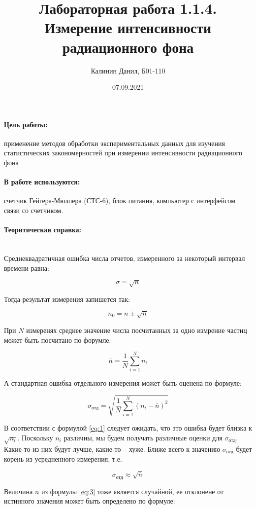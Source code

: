 \documentclass[a4paper, 12pt]{article}
\author{Калинин Данил, Б01-110}
\date{07.09.2021}
\title{Лабораторная работа 1.1.4.\\Измерение интенсивности радиационного фона}
\newcommand{\parag}[1]{\paragraph*{#1:}}
\begin{document}
\maketitle

\parag {Цель работы}
применение методов обработки экспериментальных данных для изучения статистических закономерностей при измерении интенсивности радиационного фона

\parag {В работе используются}
счетчик Гейгера-Мюллера (СТС-6), блок питания, компьютер с интерфейсом связи со счетчиком.

\parag {Теоритическая справка} ~\\
Среднеквадратичная ошибка числа отчетов, измеренного за некоторый интервал времени равна:

\begin{equation} \label{eq:1}
    \sigma = \sqrt{n}
\end{equation}

Тогда результат измерения запишется так:

\begin{equation} \label{eq:2}
    n_0 = n \pm \sqrt{n}
\end{equation}

При $N$ измеренях среднее значение числа посчитанных за одно измрение частиц может быть посчитано по форумле:

\begin{equation} \label{eq:3}
    \bar{n} = \frac{1}{N} \sum_{i=1}^N {n_i}
\end{equation}

А стандартная ошибка отдельного измерения может быть оценена по формуле:

\begin{equation} \label{eq:4}
    \sigma_{отд} = \sqrt {\frac{1}{N} \sum_{i=1}^N ({n_i - \bar{n}})^2}
\end{equation}

В соответствии с формулой \eqref{eq:1} следует ожидать, что это ошибка будет близка к $\sqrt{n_i}$.  Поскольку $n_i$ различны, мы будем получать различные оценки для $\sigma_{отд}$. Какие-то из них будут лучше, какие-то -- хуже. Ближе всего к значению $\sigma_{отд}$ будет корень из усредненного измерения, т.е.

\begin{equation} \label{eq:5}
    \sigma_{отд} \approx \sqrt{\bar{n}}
\end{equation}

Величина $\bar{n}$ из формулы \eqref{eq:3} тоже является случайной, ее отклонене от истинного значения может быть определено по формуле:
\end{document}
